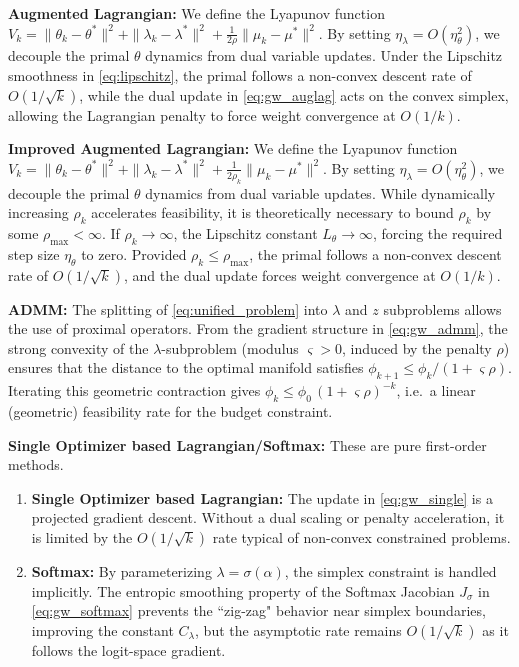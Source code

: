 \documentclass[preprint,12pt,authoryear]{elsarticle}
\begin{document}
\textbf{Augmented Lagrangian:} We define the Lyapunov function $V_k = \|\theta_k - \theta^*\|^2 + \|\lambda_k - \lambda^*\|^2 + \frac{1}{2\rho}\|\mu_k - \mu^*\|^2$. By setting $\eta_\lambda = O(\eta_\theta^2)$, we decouple the primal $\theta$ dynamics from dual variable updates. Under the Lipschitz smoothness in \eqref{eq:lipschitz}, the primal follows a non-convex descent rate of $O(1/\sqrt{k})$, while the dual update in \eqref{eq:gw_auglag} acts on the convex simplex, allowing the Lagrangian penalty to force weight convergence at $O(1/k)$.

\textbf{Improved Augmented Lagrangian:} We define the Lyapunov function $V_k = \|\theta_k - \theta^*\|^2 + \|\lambda_k - \lambda^*\|^2 + \frac{1}{2\rho_k}\|\mu_k - \mu^*\|^2$. By setting $\eta_\lambda = O(\eta_\theta^2)$, we decouple the primal $\theta$ dynamics from dual variable updates. While dynamically increasing $\rho_k$ accelerates feasibility, it is theoretically necessary to bound $\rho_k$ by some $\rho_{\max} < \infty$. If $\rho_k \to \infty$, the Lipschitz constant $L_\theta \to \infty$, forcing the required step size $\eta_\theta$ to zero. Provided $\rho_k \leq \rho_{\max}$, the primal follows a non-convex descent rate of $O(1/\sqrt{k})$, and the dual update forces weight convergence at $O(1/k)$.

\textbf{ADMM:} The splitting of \eqref{eq:unified_problem} into $\lambda$ and $z$ subproblems allows the use of proximal operators. From the gradient structure in \eqref{eq:gw_admm}, the strong convexity of the $\lambda$-subproblem (modulus $\varsigma>0$, induced by the penalty $\rho$) ensures that the distance to the optimal manifold satisfies $\phi_{k+1} \leq \phi_k / (1 + \varsigma\rho)$. Iterating this geometric contraction gives $\phi_k \leq \phi_0\,(1+\varsigma\rho)^{-k}$, i.e.\ a linear (geometric) feasibility rate for the budget constraint.

\textbf{Single Optimizer based Lagrangian/Softmax:} These are pure first-order methods. 
\begin{enumerate}
    \item \textbf{Single Optimizer based Lagrangian:} The update in \eqref{eq:gw_single} is a projected gradient descent. Without a dual scaling or penalty acceleration, it is limited by the $O(1/\sqrt{k})$ rate typical of non-convex constrained problems.
    \item \textbf{Softmax:} By parameterizing $\lambda = \sigma(\alpha)$, the simplex constraint is handled implicitly. The entropic smoothing property of the Softmax Jacobian $J_\sigma$ in \eqref{eq:gw_softmax} prevents the ``zig-zag" behavior near simplex boundaries, improving the constant $C_\lambda$, but the asymptotic rate remains $O(1/\sqrt{k})$ as it follows the logit-space gradient.
\end{enumerate}
\end{document}
